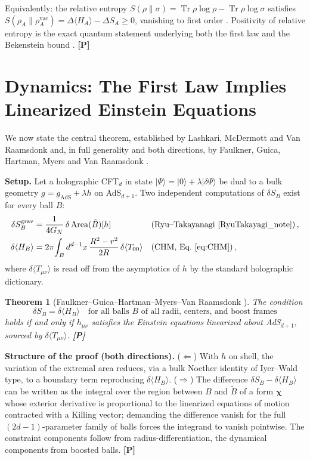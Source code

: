\documentclass[11pt]{article}
\newtheorem{theorem}{Theorem}[section]
\theoremstyle{definition}
\newcommand{\pP}{\textbf{[P]}}
\newcommand{\Tr}{\operatorname{Tr}}
\begin{document}
Equivalently: the relative entropy
$S(\rho\|\sigma)=\Tr\rho\log\rho-\Tr\rho\log\sigma$ satisfies
$S(\rho_A\|\rho_A^{\mathrm{vac}})=\Delta\langle H_A\rangle-\Delta S_A\ge 0$,
vanishing to first order \cite{BlancoCasini2013,Casini2008}. Positivity of
relative entropy is the exact quantum statement underlying both the first law
and the Bekenstein bound \cite{Casini2008}. \pP{}

\section{Dynamics: The First Law Implies Linearized Einstein Equations}

We now state the central theorem, established by Lashkari, McDermott and Van
Raamsdonk \cite{Lashkari2014} and, in full generality and both directions, by
Faulkner, Guica, Hartman, Myers and Van Raamsdonk \cite{Faulkner2014}.

\smallskip
\noindent\textbf{Setup.} Let a holographic CFT$_d$ in state
$|\Psi\rangle=|0\rangle+\lambda|\delta\Psi\rangle$ be dual to a bulk geometry
$g=g_{\mathrm{AdS}}+\lambda h$ on AdS$_{d+1}$. Two independent computations of
$\delta S_B$ exist for every ball $B$:
\begin{align}
\delta S_B^{\mathrm{grav}}
&= \frac{1}{4G_N}\,\delta\,\mathrm{Area}(\tilde B)[h]
&&\text{(Ryu--Takayanagi \cite{RyuTakayagi_note})}\,,\\
\delta\langle H_B\rangle
&= 2\pi\!\int_B d^{d-1}x\,\frac{R^2-r^2}{2R}\,
\delta\langle T_{00}\rangle
&&\text{(CHM, Eq.~\eqref{eq:CHM})}\,,
\end{align}
where $\delta\langle T_{\mu\nu}\rangle$ is read off from the asymptotics of
$h$ by the standard holographic dictionary.

\begin{theorem}[Faulkner--Guica--Hartman--Myers--Van Raamsdonk
\cite{Faulkner2014}]
The condition
\[
\delta S_B=\delta\langle H_B\rangle
\quad\text{for all balls $B$ of all radii, centers, and boost frames}
\]
holds \emph{if and only if} $h_{\mu\nu}$ satisfies the Einstein equations
linearized about AdS$_{d+1}$, sourced by $\delta\langle T_{\mu\nu}\rangle$.
\pP{}
\end{theorem}

\noindent\textbf{Structure of the proof (both directions).}
($\Leftarrow$) With $h$ on shell, the variation of the extremal area reduces,
via a bulk Noether identity of Iyer--Wald type, to a boundary term reproducing
$\delta\langle H_B\rangle$. ($\Rightarrow$) The difference
$\delta S_B-\delta\langle H_B\rangle$ can be written as the integral over the
region between $B$ and $\tilde B$ of a form $\boldsymbol{\chi}$ whose exterior
derivative is proportional to the linearized equations of motion contracted
with a Killing vector; demanding the difference vanish for the full
$(2d-1)$-parameter family of balls forces the integrand to vanish pointwise.
The constraint components follow from radius-differentiation, the dynamical
components from boosted balls. \pP{}
\end{document}
